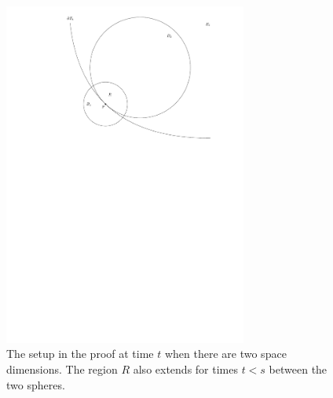 \begin{figure}
	\centering
	\includegraphics[width=0.713\textwidth]{figures/3_Hopf_boundary_point_lemma}
	\caption{The setup in the proof at time $t$ when there are two space dimensions. The region $R$ also extends for times $t<s$ between the two spheres.}
\end{figure}


